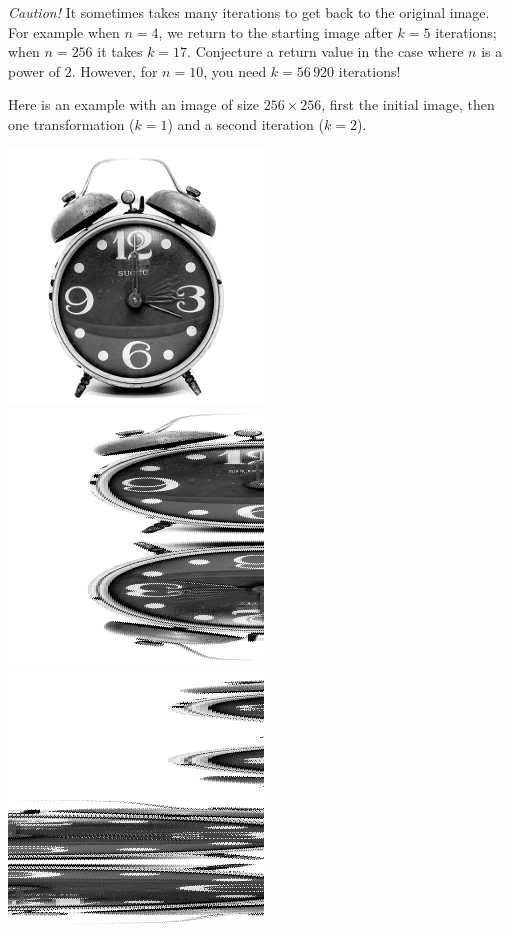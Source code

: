 \documentclass[11pt,class=report,crop=false]{standalone}
\begin{document}
\begin{activite}
\begin{enumerate}
  \emph{Caution!} It sometimes takes many iterations to get back to the original image. For example when $n=4$, we return to the starting image after $k=5$ iterations; when $n=256$ it takes $k=17$. Conjecture a return value in the case where $n$ is a power of $2$. However, for $n=10$, you need $k = 56\,920$ iterations!
   
  
\end{enumerate}

Here is an example with an image of size $256 \times 256$, first the initial image, then one transformation ($k=1$) and a second iteration ($k=2$).
\begin{center}
\includegraphics[scale=\myscale,scale=0.4]{images_chapter/clock_gimp_new_baker_0.png}\qquad
\includegraphics[scale=\myscale,scale=0.4]{images_chapter/clock_gimp_new_baker_1.png}\qquad
\includegraphics[scale=\myscale,scale=0.4]{images_chapter/clock_gimp_new_baker_2.png}

\end{center}
\end{activite}
\end{document}
